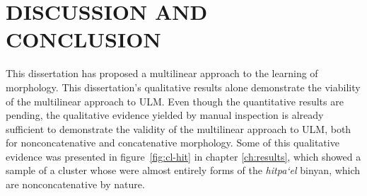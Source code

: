\chapter{DISCUSSION AND CONCLUSION}


This dissertation has proposed a multilinear approach to the learning of morphology.
This dissertation’s qualitative results alone demonstrate the 
viability of the multilinear approach to ULM. 
Even though the quantitative results
are pending, the qualitative evidence yielded by manual 
inspection is already sufficient to demonstrate the validity of the 
multilinear approach to ULM, both for nonconcatenative 
and concatenative morphology. 
Some of this qualitative evidence was 
presented in figure~\ref{fig:cl-hit} in chapter \ref{ch:results}, which 
showed a sample of a cluster whose were almost entirely forms
of the \emph{hitpa`el} binyan, which are nonconcatenative by nature. 


